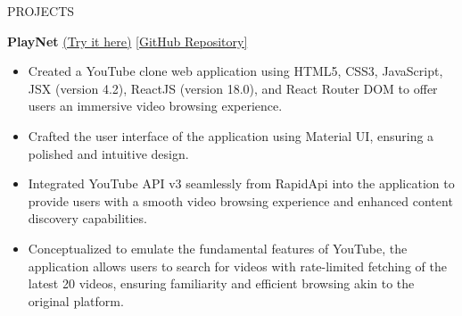 \documentclass{resume} %
\begin{document}
\begin{rSection}{PROJECTS}
    \item \textbf{PlayNet} {\href{https://play-net-eight.vercel.app/}{(Try it here)}}
    {\href{https://github.com/arkapg211002/PlayNet}{[GitHub Repository]}}
    \begin{itemize}
    \setlength\itemsep{-0.5em}
    \item Created a YouTube clone web application using HTML5, CSS3, JavaScript, JSX (version  4.2),  ReactJS (version 18.0), and React Router DOM to offer users an immersive video browsing experience.
    \item Crafted the user interface of the application using Material UI, ensuring a polished and intuitive design.
    \item Integrated YouTube API v3 seamlessly from RapidApi into the application to provide users with  a smooth video browsing experience and enhanced content discovery capabilities.
    \item Conceptualized to emulate the fundamental features of YouTube, the application allows users to search for videos with rate-limited fetching of the latest 20 videos, ensuring familiarity and efficient browsing akin to the original platform.
    \end{itemize}

\end{rSection}
\end{document}
